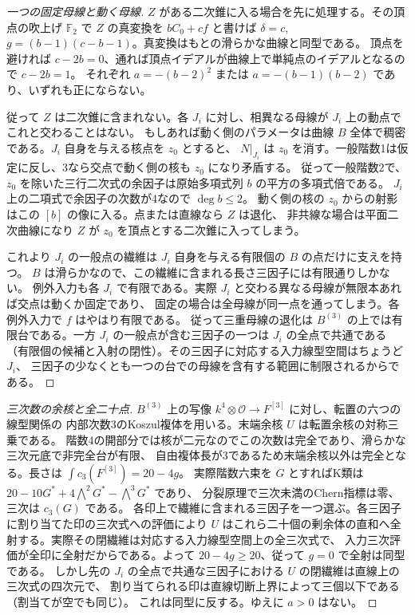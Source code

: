 \begin{proof}[一つの固定母線と動く母線]
$Z$ がある二次錐に入る場合を先に処理する。その頂点の吹上げ $\mathbb F_2$ で $Z$ の真変換を
$b C_0+c f$ と書けば $\delta=c$, $g=(b-1)(c-b-1)$。真変換はもとの滑らかな曲線と同型である。
頂点を避ければ $c-2b=0$、通れば頂点イデアルが曲線上で単純点のイデアルとなるので $c-2b=1$。
それぞれ $a=-(b-2)^2$ または $a=-(b-1)(b-2)$ であり、いずれも正にならない。

従って $Z$ は二次錐に含まれない。各 $J_i$ に対し、相異なる母線が $J_i$ 上の動点でこれと交わることはない。
もしあれば動く側のパラメータは曲線 $B$ 全体で稠密である。$J_i$ 自身を与える核点を $z_0$ とすると、
$N|_{J_i}$ は $z_0$ を消す。一般階数1は仮定に反し、3なら交点で動く側の核も $z_0$ になり矛盾する。
従って一般階数2で、$z_0$ を除いた三行二次式の余因子は原始多項式列 $b$ の平方の多項式倍である。
$J_i$ 上の二項式で余因子の次数が4なので $\deg b\le2$。
動く側の核の $z_0$ からの射影はこの $[b]$ の像に入る。点または直線なら $Z$ は退化、
非共線な場合は平面二次曲線になり $Z$ が $z_0$ を頂点とする二次錐に入ってしまう。

これより $J_i$ の一般点の繊維は $J_i$ 自身を与える有限個の $B$ の点だけに支えを持つ。
$B$ は滑らかなので、この繊維に含まれる長さ三因子には有限通りしかない。
例外入力も各 $J_i$ で有限である。実際 $J_i$ と交わる異なる母線が無限本あれば交点は動くか固定であり、
固定の場合は全母線が同一点を通ってしまう。各例外入力で $f$ はやはり有限である。
従って三重母線の退化は $B^{(3)}$ の上では有限台である。一方 $J_i$ の一般点が含む三因子の一つは
$J_i$ の全点で共通である（有限個の候補と入射の閉性）。その三因子に対応する入力線型空間はちょうど $J_i$、
三因子の少なくとも一つの台での母線を含有する範囲に制限されるからである。
\end{proof}
\begin{proof}[三次数の余核と全二十点]
$B^{(3)}$ 上の写像 $k^4\otimes\mathcal O\to F^{[3]}$ に対し、転置の六つの線型関係の
内部次数3のKoszul複体を用いる。末端余核 $U$ は転置余核の対称三乗である。
階数4の開部分では核が二元なのでこの次数は完全であり、滑らかな三次元底で非完全台が有限、
自由複体長が3であるため末端余核以外は完全となる。長さは $\int c_3(F^{[3]})=20-4g$。
実際階数六束を $G$ とすればK類は $20-10G^*+4\bigwedge^2 G^*-\bigwedge^3 G^*$ であり、
分裂原理で三次未満のChern指標は零、三次は $c_3(G)$ である。
各印上で繊維に含まれる三因子を一つ選ぶ。各三因子に割り当てた印の三次式への評価により
$U$ はこれら二十個の剰余体の直和へ全射する。実際その閉繊維は対応する入力線型空間上の全三次式で、
入力三次評価が全印に全射だからである。よって $20-4g\ge20$、従って $g=0$ で全射は同型である。
しかし先の $J_i$ の全点で共通な三因子における $U$ の閉繊維は直線上の三次式の四次元で、
割り当てられる印は直線切断上界によって三個以下である（割当てが空でも同じ）。
これは同型に反する。ゆえに $a>0$ はない。
\end{proof}
